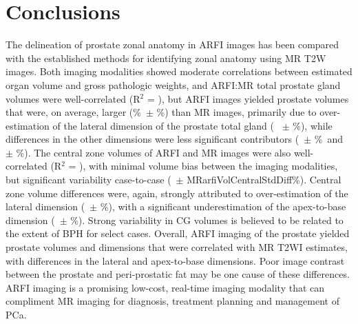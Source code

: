 \section{Conclusions}
The delineation of prostate zonal anatomy in ARFI images has been compared with
the established methods for identifying zonal anatomy using MR T2W images.
Both imaging modalities showed moderate correlations between estimated organ
volume and gross pathologic weights, and ARFI:MR total prostate gland volumes
were well-correlated (R$^2$ = \MRarfiVolTotalRsq), but ARFI images yielded
prostate volumes that were, on average, larger (\MRarfiVolTotalMeanDiff\%~$\pm$
\MRarfiVolTotalStdDiff\%) than MR images, primarily due to over-estimation of
the lateral dimension of the prostate total gland (\ARFImrTotalLatLatMeanPct~
$\pm$ \ARFImrTotalLatLatStdPct\%), while differences in the other dimensions
were less significant contributors (\ARFImrTotalAntPostMeanPct~$\pm$
\ARFImrTotalAntPostStdPct\%~and \ARFImrTotalApexBaseMeanPct~$\pm$
\ARFImrTotalApexBaseStdPct\%).  The central zone volumes of ARFI and MR images
were also well-correlated (R$^2$ = \MRarfiVolCentralRsq), with minimal volume
bias between the imaging modalities, but significant variability case-to-case
(\MRarfiVolCentralMeanDiff~$\pm$ MRarfiVolCentralStdDiff\%).  Central zone
volume differences were, again, strongly attributed to over-estimation of the
lateral dimension (\ARFImrCentralLatLatMeanPct~$\pm$
\ARFImrCentralLatLatStdPct\%), with a significant underestimation of the
apex-to-base dimension (\ARFImrCentralAntPostMeanPct~$\pm$
\ARFImrCentralAntPostStdPct\%).  Strong variability in CG volumes is believed
to be related to the extent of BPH for select cases.  Overall, ARFI imaging of
the prostate yielded prostate volumes and dimensions that were correlated with
MR T2WI estimates, with differences in the lateral and apex-to-base dimensions.
Poor image contrast between the prostate and peri-prostatic fat may be one
cause of these differences.  ARFI imaging is a promising low-cost, real-time
imaging modality that can compliment MR imaging for diagnosis, treatment
planning and management of PCa.
